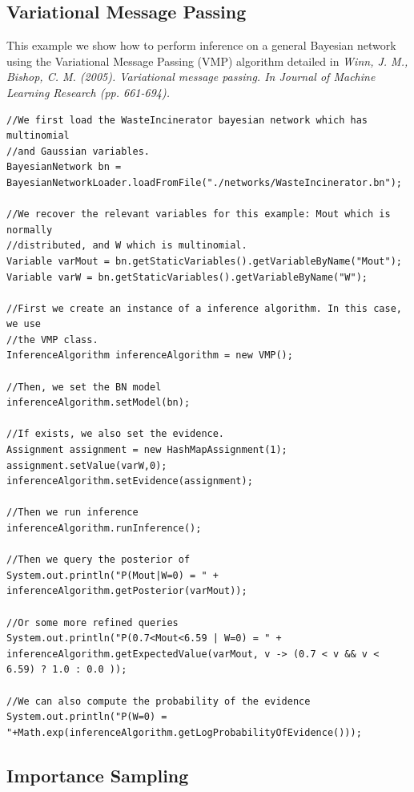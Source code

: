 \subsection{Variational Message Passing}

This example we show how to perform inference on a general Bayesian network using the Variational Message Passing (VMP)
algorithm detailed in
\vspace{0.2cm}
\textit{Winn, J. M., Bishop, C. M. (2005). Variational message passing. In Journal of Machine Learning Research (pp. 661-694).
}


\begin{lstlisting}
//We first load the WasteIncinerator bayesian network which has multinomial 
//and Gaussian variables.
BayesianNetwork bn = BayesianNetworkLoader.loadFromFile("./networks/WasteIncinerator.bn");

//We recover the relevant variables for this example: Mout which is normally 
//distributed, and W which is multinomial.
Variable varMout = bn.getStaticVariables().getVariableByName("Mout");
Variable varW = bn.getStaticVariables().getVariableByName("W");

//First we create an instance of a inference algorithm. In this case, we use 
//the VMP class.
InferenceAlgorithm inferenceAlgorithm = new VMP();

//Then, we set the BN model
inferenceAlgorithm.setModel(bn);

//If exists, we also set the evidence.
Assignment assignment = new HashMapAssignment(1);
assignment.setValue(varW,0);
inferenceAlgorithm.setEvidence(assignment);

//Then we run inference
inferenceAlgorithm.runInference();

//Then we query the posterior of
System.out.println("P(Mout|W=0) = " + inferenceAlgorithm.getPosterior(varMout));

//Or some more refined queries
System.out.println("P(0.7<Mout<6.59 | W=0) = " + inferenceAlgorithm.getExpectedValue(varMout, v -> (0.7 < v && v < 6.59) ? 1.0 : 0.0 ));

//We can also compute the probability of the evidence
System.out.println("P(W=0) = "+Math.exp(inferenceAlgorithm.getLogProbabilityOfEvidence()));
\end{lstlisting}

\subsection{Importance Sampling}


